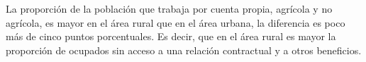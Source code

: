 La proporción de la población que trabaja por cuenta propia, agrícola y no agrícola, es mayor en el área rural que en el área urbana, la diferencia es poco más de cinco puntos porcentuales. Es decir, que en el área rural es mayor la proporción de ocupados sin acceso a una relación contractual y a otros beneficios.